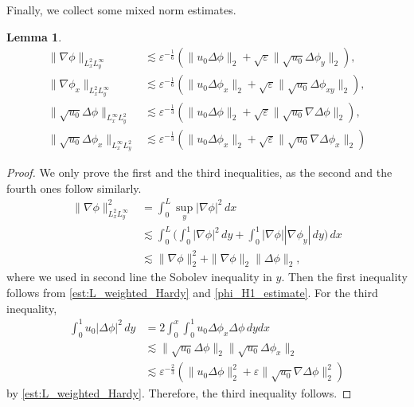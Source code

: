 \documentclass[reqno, 11pt]{amsart}
\theoremstyle{plain}
\newtheorem{lemma}[theorem]{Lemma}
\theoremstyle{definition}
\theoremstyle{remark}
\numberwithin{equation}{section}
\begin{document}
Finally, we collect some mixed norm estimates.
\begin{lemma}\label{lem:mix_norm}
\begin{equation}\label{est:mix_norm}
\begin{aligned}
\| \nabla \phi\|_{L^2_x L^\infty_y} &\lesssim \varepsilon^{-\frac{1}{6}} (\| u_0 \Delta \phi\|_2 + \sqrt{\varepsilon} \| \sqrt{u_0} \Delta \phi_y\|_2),\\
\| \nabla \phi_x\|_{L^2_x L^\infty_y} &\lesssim \varepsilon^{-\frac{1}{6}} (\| u_0 \Delta \phi_x\|_2 + \sqrt{\varepsilon} \| \sqrt{u_0} \Delta \phi_{xy}\|_2),\\
\| \sqrt{u_0} \Delta \phi\|_{L^\infty_x L^2_y} &\lesssim \varepsilon^{-\frac{1}{3}} ( \| u_0 \Delta \phi\|_2 + \sqrt{\varepsilon} \| \sqrt{u_0} \nabla \Delta \phi\|_2),\\
\| \sqrt{u_0} \Delta \phi_x\|_{L^\infty_x L^2_y} &\lesssim \varepsilon^{-\frac{1}{3}} ( \| u_0 \Delta \phi_x\|_2 + \sqrt{\varepsilon} \| \sqrt{u_0} \nabla\Delta \phi_{x}\|_2)
\end{aligned}
\end{equation}
\end{lemma}

\begin{proof}
We only prove the first and the third inequalities, as the second and the fourth ones follow similarly.
\begin{align*}
\| \nabla \phi\|_{L^2_x L^\infty_y}^2 &= \int_0^L \sup_{y} |\nabla \phi|^2 \, dx\\
&\lesssim \int_0^L \Big( \int_0^1 |\nabla \phi|^2 \, dy + \int_0^1 |\nabla \phi||\nabla \phi_y| \, dy \Big) \, dx\\
&\lesssim \| \nabla \phi \|_2^2 + \| \nabla \phi\|_2 \| \Delta \phi\|_2,
\end{align*}
where we used in second line the Sobolev inequality in $y$. Then the first inequality follows from \eqref{est:L_weighted_Hardy} and \eqref{phi_H1_estimate}. For the third inequality,
\begin{align*}
\int_0^1 u_0| \Delta \phi|^2 \, dy &= 2 \int_0^x \int_0^1 u_0 \Delta \phi_x \Delta \phi \, dy dx\\
&\lesssim \|\sqrt{u_0} \Delta \phi\|_2 \| \sqrt{u_0} \Delta \phi_{x}\|_2\\
&\lesssim \varepsilon^{-\frac{2}{3}} ( \|u_0 \Delta \phi\|_2^2 + \varepsilon \| \sqrt{u_0} \nabla\Delta \phi\|_2^2)
\end{align*}
by \eqref{est:L_weighted_Hardy}. Therefore, the third inequality follows.
\end{proof}
\end{document}
